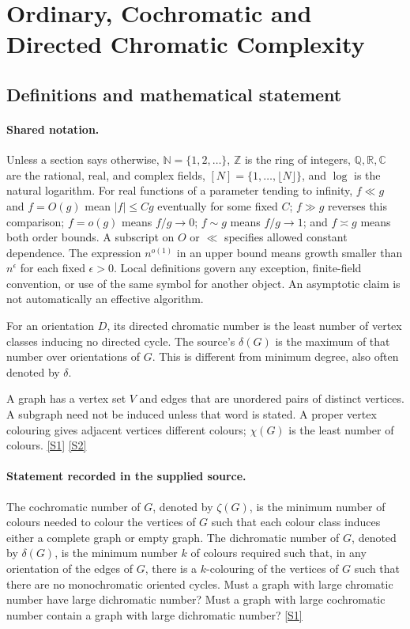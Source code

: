 \documentclass[11pt,a4paper]{article}
\newcommand{\N}{\mathbb{N}}
\newcommand{\Z}{\mathbb{Z}}
\newcommand{\Q}{\mathbb{Q}}
\newcommand{\R}{\mathbb{R}}
\newcommand{\C}{\mathbb{C}}
\newcommand{\sref}[2]{\hyperlink{source:#1:#2}{[S#2]}}
\begin{document}
\section{Ordinary, Cochromatic and Directed Chromatic Complexity}\label{statement}


\subsection{Definitions and mathematical statement}

\paragraph{Shared notation.}Unless a section says otherwise, $\N=\{1,2,\ldots\}$,
$\Z$ is the ring of integers, $\Q,\R,\C$ are the rational, real, and complex
fields, $[N]=\{1,\ldots,\lfloor N\rfloor\}$, and $\log$ is the natural
logarithm. For real functions of a parameter tending to infinity,
$f\ll g$ and $f=O(g)$ mean $|f|\leq Cg$ eventually for some fixed $C$;
$f\gg g$ reverses this comparison; $f=o(g)$ means $f/g\to0$;
$f\sim g$ means $f/g\to1$; and $f\asymp g$ means both order bounds.
A subscript on $O$ or $\ll$ specifies allowed constant dependence.
The expression $n^{o(1)}$ in an upper bound means growth smaller than
$n^\epsilon$ for each fixed $\epsilon>0$. Local definitions govern any
exception, finite-field convention, or use of the same symbol for another
object. An asymptotic claim is not automatically an effective algorithm.



For an orientation $D$, its directed chromatic number is the least number of vertex classes inducing no directed cycle. The source's $\delta(G)$ is the maximum of that number over orientations of $G$. This is different from minimum degree, also often denoted by $\delta$.

A graph has a vertex set $V$ and edges that are unordered pairs of distinct vertices. A subgraph need not be induced unless that word is stated. A proper vertex colouring gives adjacent vertices different colours; $\chi(G)$ is the least number of colours. \sref{statement}{1} \sref{statement}{2}

\paragraph{Statement recorded in the supplied source.}
The cochromatic number of $G$, denoted by $\zeta(G)$, is the minimum number of colours needed to colour the vertices of $G$ such that each colour class induces either a complete graph or empty graph. The dichromatic number of $G$, denoted by $\delta(G)$, is the minimum number $k$ of colours required such that, in any orientation of the edges of $G$, there is a $k$-colouring of the vertices of $G$ such that there are no monochromatic oriented cycles.
Must a graph with large chromatic number have large dichromatic number? Must a graph with large cochromatic number contain a graph with large dichromatic number? \sref{statement}{1}
\end{document}
